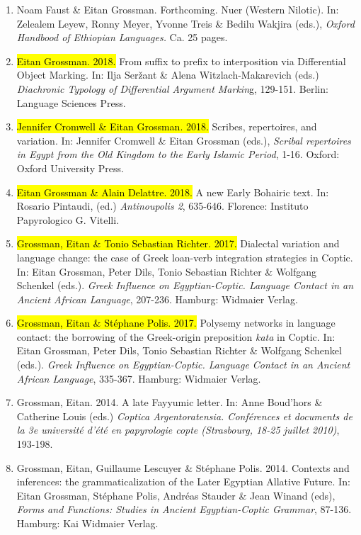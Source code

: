 \documentclass[letterpaper,11pt]{article}
\begin{document}
\begin{enumerate}[resume]
\item Noam Faust \& Eitan Grossman. Forthcoming. Nuer (Western Nilotic). In: Zelealem Leyew, Ronny Meyer, Yvonne Treis \& Bedilu Wakjira (eds.), \textit{Oxford Handbood of Ethiopian Languages.} Ca. 25 pages.

\item	\hl{Eitan Grossman. 2018.} From suffix to prefix to interposition via Differential Object Marking. In: Ilja Ser\v{z}ant \& Alena Witzlach-Makarevich (eds.) \textit{Diachronic Typology of Differential Argument Markin}g, 129-151. Berlin: Language Sciences Press.

\item \hl{Jennifer Cromwell \& Eitan Grossman. 2018.} Scribes, repertoires, and variation. In: Jennifer Cromwell \& Eitan Grossman (eds.), \textit{Scribal repertoires in Egypt from the Old Kingdom to the Early Islamic Period}, 1-16. Oxford: Oxford University Press.

\item \hl{Eitan Grossman \& Alain Delattre. 2018.} A new Early Bohairic text. In: Rosario Pintaudi, (ed.) \textit{Antinoupolis 2}, 635-646. Florence: Instituto Papyrologico G. Vitelli.

\item	\hl{Grossman, Eitan \& Tonio Sebastian Richter. 2017.} Dialectal variation and language change: the case of Greek loan-verb integration strategies in Coptic. In: Eitan Grossman, Peter Dils, Tonio Sebastian Richter \& Wolfgang Schenkel (eds.). \textit{Greek Influence on Egyptian-Coptic. Language Contact in an Ancient African Language}, 207-236. Hamburg: Widmaier Verlag.

\item	\hl{Grossman, Eitan \& St\'ephane Polis. 2017.} Polysemy networks in language contact: the borrowing of the Greek-origin preposition \textit{kata} in Coptic. In: Eitan Grossman, Peter Dils, Tonio Sebastian Richter \& Wolfgang Schenkel (eds.). \textit{Greek Influence on Egyptian-Coptic. Language Contact in an Ancient African Language}, 335-367. Hamburg: Widmaier Verlag.

\item Grossman, Eitan. 2014. A late Fayyumic letter. In: Anne Boud’hors \& Catherine Louis (eds.) \textit{Coptica Argentoratensia. Conférences et documents de la 3e université d'été en papyrologie copte (Strasbourg, 18-25 juillet 2010)},  193-198.

\item Grossman, Eitan, Guillaume Lescuyer \& St\'ephane Polis. 2014. Contexts and inferences: the grammaticalization of the Later Egyptian Allative Future. In: Eitan Grossman, St\'ephane Polis, Andr\'eas Stauder \& Jean Winand (eds), \textit{Forms and Functions: Studies in Ancient Egyptian-Coptic Grammar}, 87-136. Hamburg: Kai Widmaier Verlag. 


\end{enumerate}
\end{document}
